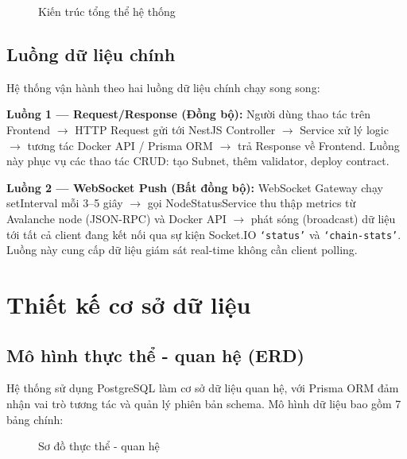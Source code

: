 \begin{figure}[H]
\centering
{}
\caption{Kiến trúc tổng thể hệ thống}
\label{fig:architecture}
\end{figure}

\subsection{Luồng dữ liệu chính}

Hệ thống vận hành theo hai luồng dữ liệu chính chạy song song:

\textbf{Luồng 1 --- Request/Response (Đồng bộ):} Người dùng thao tác trên Frontend $\rightarrow$ HTTP Request gửi tới NestJS Controller $\rightarrow$ Service xử lý logic $\rightarrow$ tương tác Docker API / Prisma ORM $\rightarrow$ trả Response về Frontend. Luồng này phục vụ các thao tác CRUD: tạo Subnet, thêm validator, deploy contract.

\textbf{Luồng 2 --- WebSocket Push (Bất đồng bộ):} WebSocket Gateway chạy setInterval mỗi 3--5 giây $\rightarrow$ gọi NodeStatusService thu thập metrics từ Avalanche node (JSON-RPC) và Docker API $\rightarrow$ phát sóng (broadcast) dữ liệu tới tất cả client đang kết nối qua sự kiện Socket.IO \texttt{`status'} và \texttt{`chain-stats'}. Luồng này cung cấp dữ liệu giám sát real-time không cần client polling.

\section{Thiết kế cơ sở dữ liệu}

\subsection{Mô hình thực thể - quan hệ (ERD)}

Hệ thống sử dụng PostgreSQL làm cơ sở dữ liệu quan hệ, với Prisma ORM đảm nhận vai trò tương tác và quản lý phiên bản schema. Mô hình dữ liệu bao gồm 7 bảng chính:

\begin{figure}[H]
\centering
{}
\caption{Sơ đồ thực thể - quan hệ}
\label{fig:erd}
\end{figure}

